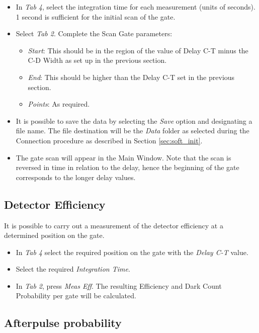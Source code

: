 \documentclass{article}
\begin{document}
\begin{itemize}
\item
In \emph{Tab 4}, select the integration time for each measurement (units of seconds). 1 second is sufficient for the initial scan of the gate.
\item
Select \emph{Tab 2}. Complete the Scan Gate parameters:
\begin{itemize}
\item
\emph{Start}: This should be in the region of the value of Delay C-T minus the C-D Width as set up in the previous section.
\item
\emph{End}: This should be higher than the Delay C-T set in the previous section.
\item
\emph{Points}: As required.
\end{itemize}

\item
It is possible to save the data by selecting the \emph{Save} option and designating a file name. The file destination will be the \emph{Data} folder as selected during the Connection procedure as described in Section \ref{sec:soft_init}.
\item
The gate scan will appear in the Main Window. Note that the scan is reversed in time in relation to the delay, hence the beginning of the gate corresponds to the longer delay values.
\end{itemize}



\subsection{Detector Efficiency}
\label{sec:eff}
It is possible to carry out a measurement of the detector efficiency at a determined position on the gate.
\begin{itemize}
\item
In \emph{Tab 4} select the required position on the gate with the \emph{Delay C-T} value.
\item 
Select the required \emph{Integration Time}.
\item
In \emph{Tab 2}, press \emph{Meas Eff}. The resulting Efficiency and Dark Count Probability per gate will be calculated. 

\end{itemize}



\subsection{Afterpulse probability}
\end{document}
